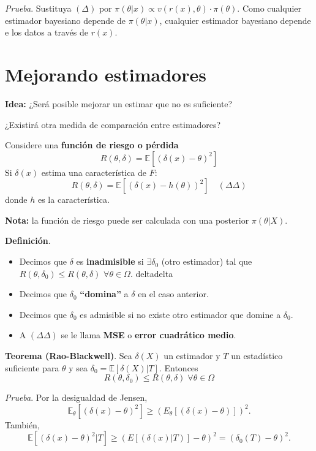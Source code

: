 \documentclass[
  12pt,
]{book}
\begin{document}
\emph{Prueba}. Sustituya \((\Delta)\) por \(\pi(\theta|x) \propto v(r(x),\theta)\cdot\pi(\theta)\). Como cualquier
estimador bayesiano depende de \(\pi(\theta|x)\), cualquier estimador bayesiano depende
e los datos a través de \(r(x)\).

\hypertarget{mejorando-estimadores}{%
\section{Mejorando estimadores}\label{mejorando-estimadores}}

\textbf{Idea:} ¿Será posible mejorar un estimar que no es suficiente?

¿Existirá otra medida de comparación entre estimadores?

Considere una \textbf{función de riesgo o pérdida}
\[ R(\theta,\delta) = \mathbb E[(\delta(x)-\theta) ^2]\]
Si \(\delta(x)\) estima una característica de \(F\):
\[ R(\theta,\delta) = \mathbb E[(\delta(x)-h(\theta))^2]\quad (\Delta\Delta)\]
donde \(h\) es la característica.

\textbf{Nota:} la función de riesgo puede ser calculada con una posterior \(\pi(\theta|X)\).

\textbf{Definición}.

\begin{itemize}
\item
  Decimos que \(\delta\) es \textbf{inadmisible} si \(\exists \delta_0\) (otro estimador) tal que
  \(R(\theta, \delta_{0}) \leq R(\theta,\delta)\) \(\forall \theta \in \Omega\).
  deltadelta
\item
  Decimos que \(\delta_0\) \textbf{``domina''} a \(\delta\) en el caso anterior.
\item
  Decimos que \(\delta_0\) es admisible si no existe otro estimador que domine a
  \(\delta_0\).
\item
  A \((\Delta \Delta)\) se le llama \textbf{MSE} o \textbf{error cuadrático medio}.
\end{itemize}

\textbf{Teorema (Rao-Blackwell)}. Sea \(\delta(X)\) un estimador y \(T\) un estadístico
suficiente para \(\theta\) y sea \(\delta_0 = \mathbb E[\delta(X)|T]\). Entonces \[ R(\theta,\delta_0) \leq
R(\theta,\delta) \; \forall \theta \in \Omega\]

\emph{Prueba}. Por la desigualdad de Jensen,
\[ \mathbb E_\theta[(\delta(x)-\theta)^2] \geq (E_\theta[(\delta(x)-\theta)])^2. \]
También,
\[\mathbb E[(\delta(x)-\theta)^2|T] \geq (E[(\delta(x)|T)]-\theta)^2 = (\delta_0(T)-\theta)^2.\]
\end{document}
